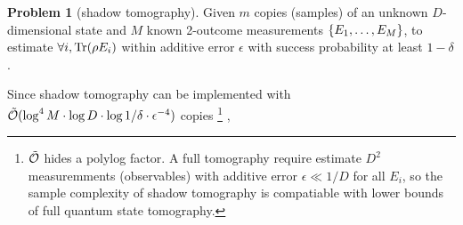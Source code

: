 \documentclass[
aps,
pra,
twocolumn,
floatfix,
]{revtex4-2}
\theoremstyle{plain}
\newtheorem{theorem}{Theorem}
\theoremstyle{definition}
\newtheorem{problem}{Problem}
\newcommand{\ob}{O}
\newcommand{\dm}{\rho}
\begin{document}
\begin{problem}[shadow tomography]\label{prm:shadow_tomography}
	Given $m$ copies (samples) of an unknown $D$-dimensional state and $M$ known 2-outcome measurements $\qty{E_1,\dots,E_M}$,
	to estimate $\forall i,\Tr(\dm E_i)$ within additive error $\epsilon$ with success probability at least $1-\delta$.
\end{problem}
Since shadow tomography can be implemented with $\tilde{\mathcal{O}}(\log^4 M\cdot \log D\cdot \log 1/\delta \cdot\epsilon^{-4})$ copies \footnote{$\tilde{\mathcal{O}}$ hides a polylog factor. A full tomography require estimate $D^2$ measuremments (observables) with additive error $\epsilon\ll 1/D$ for all $E_i$, so the sample complexity of shadow tomography is compatiable with lower bounds of full quantum state tomography.} \cite{aaronsonShadowTomographyQuantum2018},
\end{document}
